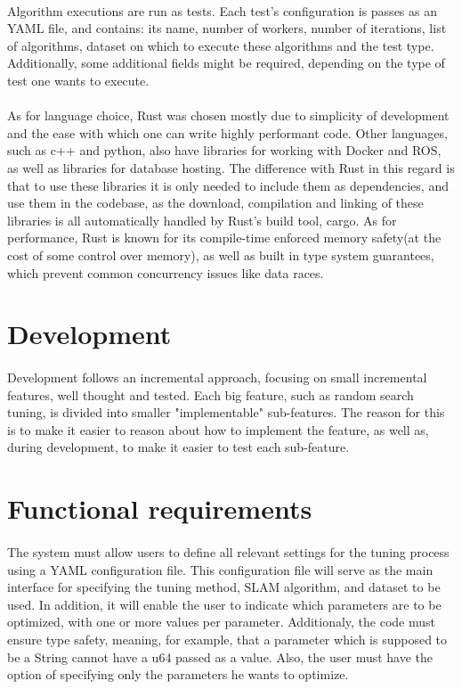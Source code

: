 \paragraph{}Algorithm executions are run as tests. Each test's configuration is passes as an YAML file, and contains: its name, number of workers, number of iterations, list of algorithms, dataset on which to execute these algorithms and the test type. Additionally, some additional fields might be required, depending on the type of test one wants to execute.

\paragraph{}As for language choice, Rust was chosen mostly due to simplicity of development and the ease with which one can write highly performant code. Other languages, such as c++ and python, also have libraries for working with Docker and ROS, as well as libraries for database hosting. The difference with Rust in this regard is that to use these libraries it is only needed to include them as dependencies, and use them in the codebase, as the download, compilation and linking of these libraries is all automatically handled by Rust's build tool, cargo. As for performance, Rust is known for its compile-time enforced memory safety(at the cost of some control over memory), as well as built in type system guarantees, which prevent common concurrency issues like data races.

\section{Development}
\paragraph{}Development follows an incremental approach, focusing on small incremental features, well thought and tested. Each big feature, such as random search tuning, is divided into smaller "implementable" sub-features. The reason for this is to make it easier to reason about how to implement the feature, as well as, during development, to make it easier to test each sub-feature.

\section{Functional requirements}

\paragraph{}The system must allow users to define all relevant settings for the tuning process using a YAML configuration file. This configuration file will serve as the main interface for specifying the tuning method, SLAM algorithm, and dataset to be used. In addition, it will enable the user to indicate which parameters are to be optimized, with one or more values per parameter. Additionaly, the code must ensure type safety, meaning, for example, that a parameter which is supposed to be a String cannot have a u64 passed as a value. Also, the user must have the option of specifying only the parameters he wants to optimize. 

